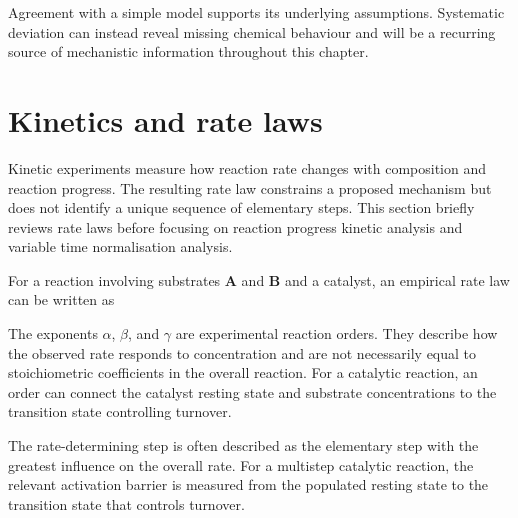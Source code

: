Agreement with a simple model supports its underlying assumptions.
Systematic deviation can instead reveal missing chemical behaviour and will be a recurring source of mechanistic information throughout this chapter.

\section{Kinetics and rate laws}

Kinetic experiments measure how reaction rate changes with composition and reaction progress.
The resulting rate law constrains a proposed mechanism but does not identify a unique sequence of elementary steps.
This section briefly reviews rate laws before focusing on reaction progress kinetic analysis and variable time normalisation analysis.

For a reaction involving substrates \textbf{A} and \textbf{B} and a catalyst, an empirical rate law can be written as


The exponents \(\alpha\), \(\beta\), and \(\gamma\) are experimental reaction orders.
They describe how the observed rate responds to concentration and are not necessarily equal to stoichiometric coefficients in the overall reaction.
For a catalytic reaction, an order can connect the catalyst resting state and substrate concentrations to the transition state controlling turnover.

The rate-determining step is often described as the elementary step with the greatest influence on the overall rate.
For a multistep catalytic reaction, the relevant activation barrier is measured from the populated resting state to the transition state that controls turnover.

